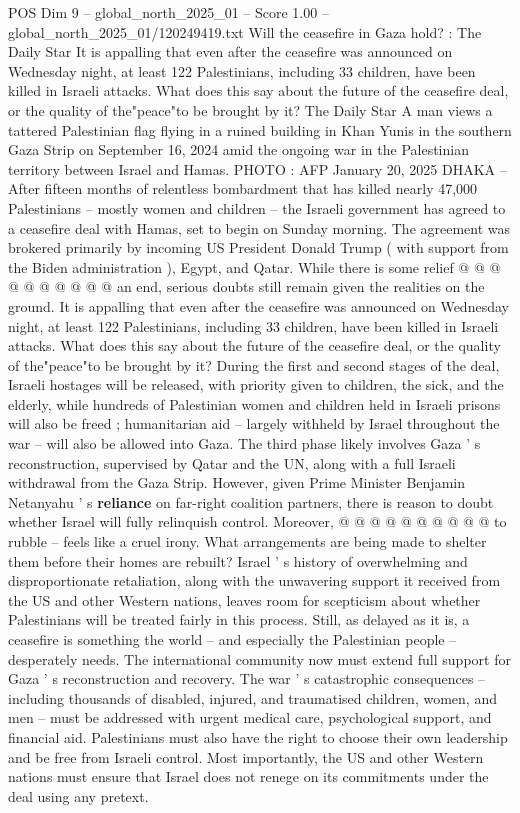 \begin{textsample}{POS Dim 9 – global\_north\_2025\_01 – Score 1.00 – global\_north\_2025\_01/120249419.txt}  \label{ex:f9_pos_424}
Will the ceasefire in Gaza hold? : The Daily Star It is appalling that even after the ceasefire was announced on Wednesday night, at least 122 Palestinians, including 33 children, have been killed in Israeli attacks.
What does this say about the future of the ceasefire deal, or the quality of the"peace"to be brought by it?
The Daily Star A man views a tattered Palestinian flag flying in a ruined building in Khan Yunis in the southern Gaza Strip on September 16, 2024 amid the ongoing war in the Palestinian territory between Israel and Hamas.
PHOTO : AFP January 20, 2025 DHAKA -- After fifteen months of relentless bombardment that has killed nearly 47,000 Palestinians -- mostly women and children -- the Israeli government has agreed to a ceasefire deal with Hamas, set to begin on Sunday morning.
The agreement was brokered primarily by incoming US President Donald Trump ( with support from the Biden administration ), Egypt, and Qatar.
While there is some relief @ @ @ @ @ @ @ @ @ @ an end, serious doubts still remain given the realities on the ground.
It is appalling that even after the ceasefire was announced on Wednesday night, at least 122 Palestinians, including 33 children, have been killed in Israeli attacks.
What does this say about the future of the ceasefire deal, or the quality of the"peace"to be brought by it?
During the first and second stages of the deal, Israeli hostages will be released, with priority given to children, the sick, and the elderly, while hundreds of Palestinian women and children held in Israeli prisons will also be freed ; humanitarian aid -- largely withheld by Israel throughout the war -- will also be allowed into Gaza.
The third phase likely involves Gaza ' s reconstruction, supervised by Qatar and the UN, along with a full Israeli withdrawal from the Gaza Strip.
However, given Prime Minister Benjamin Netanyahu ' s \textbf{reliance} on far-right coalition partners, there is reason to doubt whether Israel will fully relinquish control.
Moreover, @ @ @ @ @ @ @ @ @ @ to rubble -- feels like a cruel irony.
What arrangements are being made to shelter them before their homes are rebuilt?
Israel ' s history of overwhelming and disproportionate retaliation, along with the unwavering support it received from the US and other Western nations, leaves room for scepticism about whether Palestinians will be treated fairly in this process.
Still, as delayed as it is, a ceasefire is something the world -- and especially the Palestinian people -- desperately needs.
The international community now must extend full support for Gaza ' s reconstruction and recovery.
The war ' s catastrophic consequences -- including thousands of disabled, injured, and traumatised children, women, and men -- must be addressed with urgent medical care, psychological support, and financial aid.
Palestinians must also have the right to choose their own leadership and be free from Israeli control.
Most importantly, the US and other Western nations must ensure that Israel does not renege on its commitments under the deal using any pretext.

\end{textsample}
